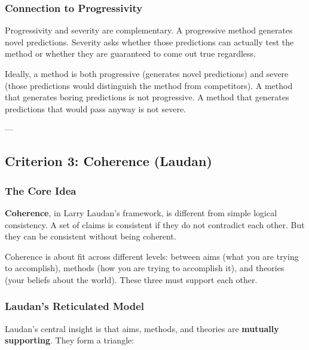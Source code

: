 \documentclass[11pt,letterpaper]{article}
\begin{document}
\subsubsection*{Connection to Progressivity}

Progressivity and severity are complementary. A progressive method generates novel predictions. Severity asks whether those predictions can actually test the method or whether they are guaranteed to come out true regardless.

Ideally, a method is both progressive (generates novel predictions) and severe (those predictions would distinguish the method from competitors). A method that generates boring predictions is not progressive. A method that generates predictions that would pass anyway is not severe.

---

\newpage

\subsection{Criterion 3: Coherence (Laudan)}

\subsubsection*{The Core Idea}

\textbf{Coherence}, in Larry Laudan's framework, is different from simple logical consistency. A set of claims is consistent if they do not contradict each other. But they can be consistent without being coherent.

Coherence is about fit across different levels: between aims (what you are trying to accomplish), methods (how you are trying to accomplish it), and theories (your beliefs about the world). These three must support each other.

\subsubsection*{Laudan's Reticulated Model}

Laudan's central insight is that aims, methods, and theories are \textbf{mutually supporting}. They form a triangle:

\begin{center}
\end{center}
\end{document}
